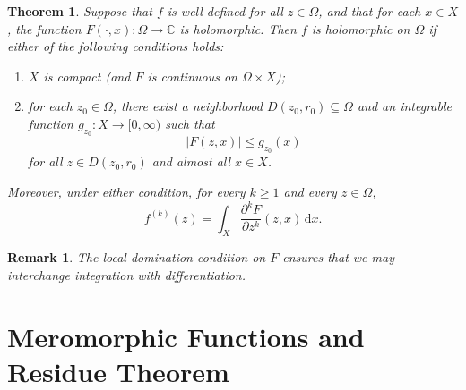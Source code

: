 \documentclass{article}
\newtheorem{theorem}{Theorem}[section]
\newtheorem*{remark}{Remark}
\theoremstyle{definition}
\newcommand{\dd}{\mathrm{d}}
\renewcommand{\leq}{\leqslant}
\renewcommand{\ge}{\geqslant}
\begin{document}
\begin{theorem}\label{thm:holomorphic-integral}
    Suppose that \(f\) is well-defined for all \(z\in \Omega\), and that for each \(x\in X\), the function \(F(\cdot,x)\colon\Omega\to\mathbb C\) is holomorphic. Then \(f\) is holomorphic on \(\Omega\) if either of the following conditions holds:
    \begin{enumerate}
        \item \(X\) is compact (and \(F\) is continuous on \(\Omega\times X\));
        \item for each \(z_0\in \Omega\), there exist a neighborhood \(D(z_0,r_0)\subseteq \Omega\) and an integrable function \(g_{z_0}\colon X\to[0,\infty)\) such that
        \[
            |F(z,x)| \leq g_{z_0}(x)
        \]
        for all \(z\in D(z_0,r_0)\) and almost all \(x\in X\).
    \end{enumerate}
    Moreover, under either condition, for every \(k\ge 1\) and every \(z\in \Omega\),
    \begin{equation*}
        f^{(k)}(z) = \int_X \frac{\partial^k F}{\partial z^k}(z,x)\, \dd x.
    \end{equation*}
\end{theorem}
\begin{remark}
    The local domination condition on $F$ ensures that we may interchange integration with differentiation.
\end{remark}
\section{Meromorphic Functions and Residue Theorem}
\end{document}
